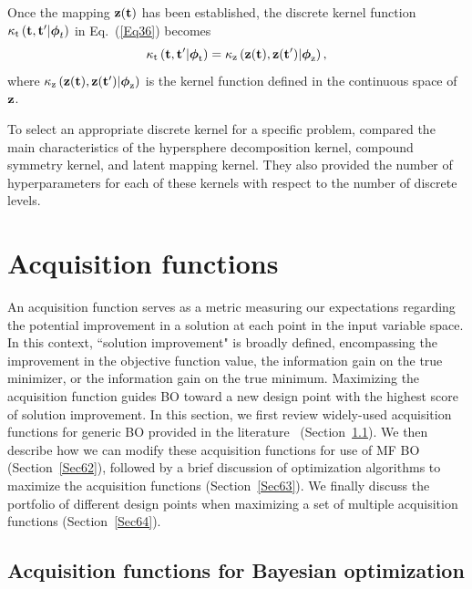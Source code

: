 \documentclass[iicol,sn-basic]{sn-jnl}%
\theoremstyle{thmstyleone}%
\theoremstyle{thmstyletwo}
\theoremstyle{thmstylethree}
\begin{document}
\begin{linenumbers}
Once the mapping ${\bf z}({\bf t})$ has been established, the discrete kernel function $\kappa_\text{t}\left({\bf t},{\bf t}'|{\boldsymbol \phi}_t\right)$ in Eq.~(\ref{Eq36}) becomes~\citep{Foumani2023}
\begin{equation}\label{Eq40}
	\kappa_\text{t}\left({\bf t},{\bf t}'|{\boldsymbol \phi}_\text{t}\right)=\kappa_\text{z}\left({\bf z}({\bf t}),{\bf z}({\bf t}')|{\boldsymbol \phi}_\text{z}\right),
\end{equation}
where $\kappa_\text{z}\left({\bf z}({\bf t}),{\bf z}({\bf t}')|{\boldsymbol \phi}_\text{z}\right)$ is the kernel function defined in the continuous space of ${\bf z}$.

To select an appropriate discrete kernel for a specific problem, \cite{Pelamatti2021} compared the main characteristics of the hypersphere decomposition kernel, compound symmetry kernel, and latent mapping kernel.
They also provided the number of hyperparameters for each of these kernels with respect to the number of discrete levels.

\section{Acquisition functions}\label{Sec6}

An acquisition function serves as a metric measuring our expectations regarding the potential improvement in a solution at each point in the input variable space.
In this context, ``solution improvement" is broadly defined, encompassing the improvement in the objective function value, the information gain on the true minimizer, or the information gain on the true minimum.
Maximizing the acquisition function guides BO toward a new design point with the highest score of solution improvement.
In this section, we first review widely-used acquisition functions for generic BO provided in the literature~\citep{Shahriari2016,Frazier2018,Wang2023} (Section~\ref{Sec61}).
We then describe how we can modify these acquisition functions for use of MF BO (Section~\ref{Sec62}), followed by a brief discussion of optimization algorithms to maximize the acquisition functions (Section~\ref{Sec63}).
We finally discuss the portfolio of different design points when maximizing a set of multiple acquisition functions (Section~\ref{Sec64}).

\subsection{Acquisition functions for Bayesian optimization}\label{Sec61}

\end{linenumbers}
\end{document}
